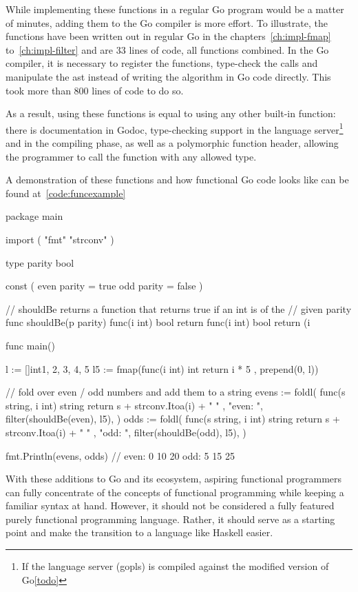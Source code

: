 While implementing these functions in a regular Go program would be a matter of minutes,
adding them to the Go compiler is more effort. To illustrate, the functions
have been written out in regular Go in the chapters~\ref{ch:impl-fmap} to~\ref{ch:impl-filter}
and are 33 lines of code, all functions combined. In the Go compiler, it is necessary to
register the functions, type-check the calls and manipulate the \gls{ast} instead of writing
the algorithm in Go code directly. This took more than 800 lines of code to do so.

As a result, using these functions is equal to using any other built-in function: there
is documentation in Godoc, type-checking support in the language server\footnote{If the
	language server (gopls) is compiled against the modified version of Go\ref{todo}}
and in the compiling phase, as well as a polymorphic function header, allowing the
programmer to call the function with any allowed type.

A demonstration of these functions and how functional Go code looks like can be found at~\ref{code:funcexample}

\begin{listing}[ht]
\begin{code}
	\label{code:funcexample}
\begin{gocode}
package main

import (
	"fmt"
	"strconv"
)

type parity bool

const (
	even parity = true
	odd  parity = false
)

// shouldBe returns a function that returns true if an int is of the
// given parity
func shouldBe(p parity) func(i int) bool {
	return func(i int) bool {
		return (i%
	}
}

func main() {
	l := []int{1, 2, 3, 4, 5}
	l5 := fmap(func(i int) int { return i * 5 }, prepend(0, l))

	// fold over even / odd numbers and add them to a string
	evens := foldl(
		func(s string, i int) string { return s + strconv.Itoa(i) + " " },
		"even: ",
		filter(shouldBe(even), l5),
	)
	odds := foldl(
		func(s string, i int) string { return s + strconv.Itoa(i) + " " },
		"odd: ",
		filter(shouldBe(odd), l5),
	)

	fmt.Println(evens, odds) // even: 0 10 20  odd: 5 15 25
}

\end{gocode}
\end{code}
\end{listing}

With these additions to Go and its ecosystem, aspiring functional programmers
can fully concentrate of the concepts of functional programming while keeping
a familiar syntax at hand. However, it should not be considered a fully featured
purely functional programming language. Rather, it should serve as a starting point and
make the transition to a language like Haskell easier.
